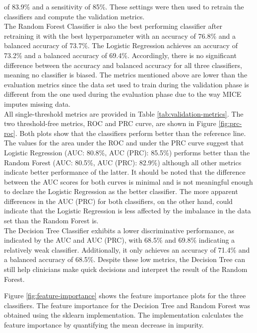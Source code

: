 of 83.9\% and a sensitivity of 85\%. These settings were then used to retrain 
the classifiers and compute the validation metrics.
\\
The Random Forest Classifier is also the best performing classifier after 
retraining it with the best hyperparameter with an accuracy of 76.8\% and a 
balanced accuracy of 73.7\%. The Logistic Regression achieves an accuracy of 
73.2\% and a balanced accuracy of 69.4\%. Accordingly, there is 
no significant difference between the accuracy and balanced accuracy for 
all three classifiers, meaning no classifier is biased.
The metrics mentioned above are lower than the evaluation metrics since the 
data 
set used to train during the validation phase is different from the one used 
during the evaluation phase due to the way MICE imputes missing data.
\\
All single-threshold metrics are provided in Table \ref{tab:validation-metrics}.
The two threshold-free metrics, ROC and PRC curve, are shown in Figure 
\ref{fig:prc-roc}. Both plots show that the classifiers perform better than the 
reference line. The values for the area under the ROC and under the PRC curve 
suggest that Logistic Regression (AUC: 80.8\%, AUC (PRC): 85.5\%) performs 
better than the Random Forest (AUC: 80.5\%, AUC (PRC): 82.9\%) although all 
other metrics indicate better performance of the latter. It 
should be noted that the difference between the AUC scores for both curves is 
minimal and is not meaningful enough to declare the Logistic Regression as the 
better classifier. The more apparent differences in the AUC (PRC) for both 
classifiers, on the other hand, could indicate that the Logistic Regression is 
less affected by the imbalance in the data set than the Random Forest is.
\\
The Decision Tree Classifier exhibits a lower discriminative performance,
as indicated by the AUC and AUC (PRC), with 68.5\% and 69.8\% 
indicating a relatively weak classifier. Additionally, it only 
achieves an accuracy of 71.4\% and a balanced accuracy of 68.5\%. Despite 
these low metrics, the Decision Tree can still 
help clinicians make quick decisions and interpret the result of the Random 
Forest.
\par
Figure \ref{fig:feature-importance} shows the feature importance plots for the 
three classifiers. The feature importance for the Decision Tree and Random 
Forest was obtained using the sklearn implementation. The implementation 
calculates 
the feature importance by quantifying the mean decrease in impurity. 
